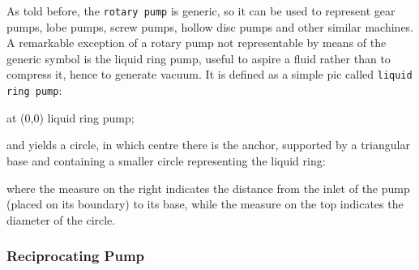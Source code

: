 \documentclass[12pt]{article}						%
\newcommand*{\chpn}[1]{\texttt{#1}}				%
\newcommand*{\chpp}[1]{\texttt{#1}}				%
\begin{document}
As told before, the \chpp{rotary pump} is generic, so it can be used to
represent gear pumps, lobe pumps, screw pumps, hollow disc pumps and other
similar machines. A remarkable exception of a rotary pump not representable by
means of the generic symbol is the liquid ring pump, useful to aspire a fluid
rather than to compress it, hence to generate vacuum. It is defined as a simple
pic called \chpp{liquid ring pump}:
\begin{chpcode}
	\pic at (0,0) {liquid ring pump};
\end{chpcode}
and yields a circle, in which centre there is the anchor, supported by a
triangular base and containing a smaller circle representing the liquid ring:
\begin{center}
\end{center}
where the measure on the right indicates the distance from the inlet of the pump
(placed on its boundary) to its base, while the measure on the top indicates the
diameter of the circle.

\subsubsection{Reciprocating Pump}
\end{document}
